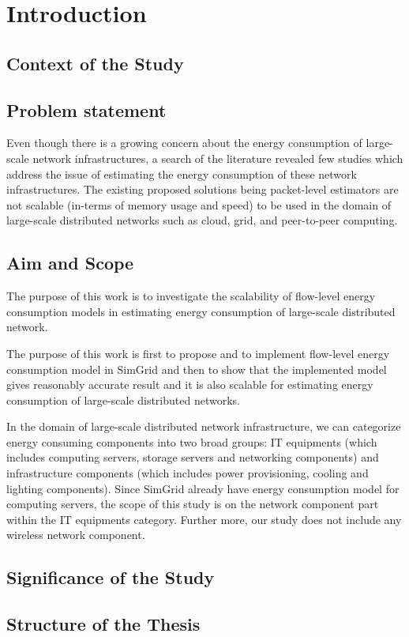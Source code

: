 \chapter{Introduction}
\label{chapter:intro}

\section{Context of the Study}

\section{Problem statement}
Even though there is a growing concern about the energy consumption of large-scale network infrastructures, a search of the literature revealed few studies which address the issue of estimating the energy consumption of these network infrastructures. The existing proposed solutions being packet-level estimators are not scalable (in-terms of memory usage and speed) to be used in the domain of large-scale distributed networks such as cloud, grid, and peer-to-peer computing. 

\section{Aim and Scope}

The purpose of this work is to investigate the scalability of flow-level energy consumption models in estimating energy consumption of large-scale distributed network. 

The purpose of this work is first to propose and to implement flow-level energy consumption model in SimGrid and then to show that the implemented model gives reasonably accurate result and it is also scalable for estimating energy consumption of large-scale distributed networks.

In the domain of large-scale distributed network infrastructure, we can categorize energy consuming components into two broad groups: IT equipments (which includes computing servers, storage servers and networking components) and infrastructure components (which includes power provisioning, cooling and lighting components). Since SimGrid already have energy consumption model for computing servers, the scope of this study is on the network component part within the IT equipments category. Further more, our study does not include any wireless network component. 

\section{Significance of the Study}

\section{Structure of the Thesis}
\label{section:structure} 


